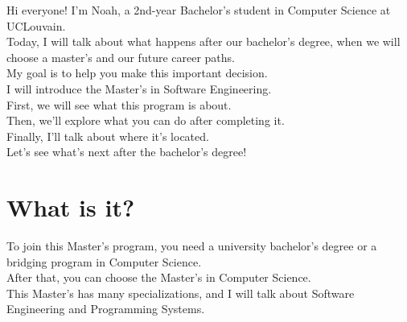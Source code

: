 \documentclass{article}
\begin{document}
Hi everyone! I’m Noah, a 2nd-year Bachelor’s student in Computer Science at UCLouvain.\\

Today, I will talk about what happens after our bachelor’s degree,
when we will choose a master’s and our future career paths. \\

My goal is to help you make this important decision.\\

I will introduce the Master’s in Software Engineering.\\  
First, we will see what this program is about.  \\

Then, we’ll explore what you can do after completing it.\\  
Finally, I’ll talk about where it’s located.\\

Let’s see what’s next after the bachelor’s degree!

\section{What is it?}

To join this Master’s program, you need a university bachelor’s degree or 
a bridging program in Computer Science. \\
After that, you can choose the Master’s in Computer Science.\\ 
This Master’s has many specializations, and I will talk about Software Engineering and Programming Systems.\\
\end{document}
